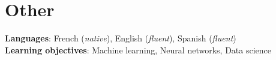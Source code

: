 \documentclass[letterpaper,11pt]{article}
\begin{document}
\section{Other}
 \begin{itemize}[leftmargin=0.15in, label={}]
    \small{\item{
      \textbf{Languages}{: French (\emph{native}), English (\emph{fluent}), Spanish (\emph{fluent})} \\
      \textbf{Learning objectives}{: Machine learning, Neural networks, Data science} \\
    }}
 \end{itemize}


\end{document}
